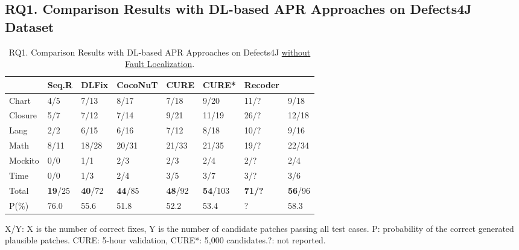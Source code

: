 \subsection{\bf RQ1. Comparison Results with DL-based APR Approaches on Defects4J Dataset}

\begin{table}[t]
  \caption{RQ1. Comparison Results with DL-based APR Approaches on Defects4J \underline {without Fault Localization}.}
  \vspace{-6pt}
  \tabcolsep 4pt
  {\footnotesize
			\begin{center}
				\renewcommand{\arraystretch}{1}
				\begin{tabular}{p{0.8cm}<{\centering}|p{0.8cm}<{\centering}|p{0.9cm}<{\centering}|p{1cm}<{\centering}|p{0.8cm}<{\centering}|p{0.8cm}<{\centering}|p{0.9cm}<{\centering}|p{0.8cm}<{\centering}}
					
					\hline
					&\textbf{Seq.R}&\textbf{DLFix}& \textbf{CocoNuT}&\textbf{CURE}&\textbf{CURE*}&\textbf{Recoder}&\textbf{\tool}\\
					\hline
					Chart  & 4/5   & 7/13  & 8/17  & 7/18  & 9/20 & 11/? & 9/18\\
					Closure& 5/7   & 7/12  & 7/14  & 9/21 & 11/19  & 26/? & 12/18\\
					Lang   & 2/2   & 6/15  & 6/16  & 7/12 & 8/18 & 10/? & 9/16\\
					Math    & 8/11  & 18/28 & 20/31 & 21/33 & 21/35 & 19/? & 22/34\\
					Mockito & 0/0   & 1/1   & 2/3   & 2/3  &2/4 & 2/? & 2/4\\
					Time    & 0/0   & 1/3   & 2/4   & 3/5  &3/7 & 3/? & 3/6\\
					\hline
					Total   & {\bf 19}/25 & {\bf 40}/72 & {\bf 44}/85 & {\bf 48}/92 & {\bf 54}/103 & {\bf 71/?} & {\bf 56}/96\\
					\hline
					P(\%)  & 76.0  & 55.6  & 51.8  & 52.2  &  53.4 & ? & 58.3\\
					\hline
				\end{tabular}
			{\footnotesize{
				X/Y: X is the number of correct fixes, Y is the number of candidate patches passing all test cases. P: probability of the correct generated plausible patches. CURE: 5-hour validation, CURE*: 5,000 candidates.?: not reported.}}

				\label{RQ1_defect4j}
			\end{center}
                }
		\end{table}

